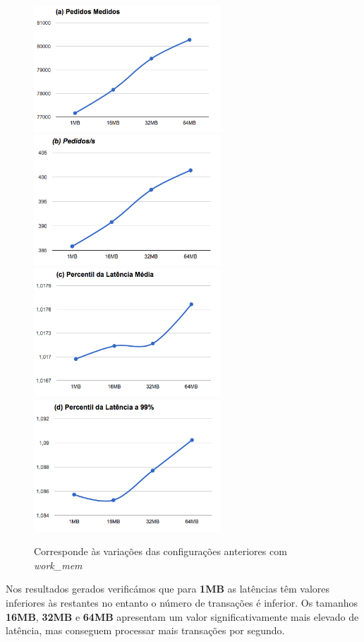 \begin{figure}[ht!]
\centering
\includegraphics[width=70mm]{img/questao_3/sb_ecs_cs_vacuum_rpc_wm_a.png}
\includegraphics[width=70mm]{img/questao_3/sb_ecs_cs_vacuum_rpc_wm_b.png}
\includegraphics[width=70mm]{img/questao_3/sb_ecs_cs_vacuum_rpc_wm_c.png}
\includegraphics[width=70mm]{img/questao_3/sb_ecs_cs_vacuum_rpc_wm_d.png}
\caption{Corresponde às variações das configurações anteriores com \textit{work\_mem}}
\end{figure}

Nos resultados gerados verificámos que para \textbf{1MB} as latências têm valores inferiores às restantes no entanto o número de transações é inferior. Os tamanhos \textbf{16MB}, \textbf{32MB} e \textbf{64MB} apresentam um valor significativamente mais elevado de latência, mas conseguem processar mais transações por segundo.


